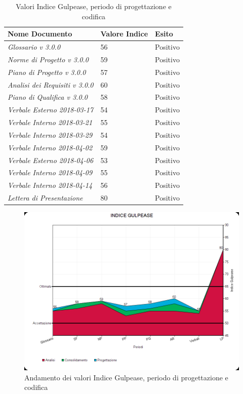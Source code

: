 \documentclass[openany,12pt,a4paper]{report}
\begin{document}
\begin{itemize}
	\begin{table}[h]
		\begin{center}
			\setlength\LTleft{6mm}
			\begin{longtable}{|p{60mm}|p{30mm}|p{25mm}|}
				\hline  
				\textbf{Nome Documento} & \textbf{Valore Indice} & \textbf{Esito} \\ \hline    
				\textit{Glossario v 3.0.0} & 56 & Positivo\\ \hline    
				\textit{Norme di Progetto v 3.0.0} & 59 & Positivo\\ \hline    
				\textit{Piano di Progetto v 3.0.0} & 57 & Positivo\\ \hline    
				\textit{Analisi dei Requisiti v 3.0.0} & 60 & Positivo\\ \hline    
				\textit{Piano di Qualifica v 3.0.0} & 58 & Positivo\\ \hline    
				\textit{Verbale Esterno 2018-03-17} & 54 & Positivo\\ \hline
				\textit{Verbale Interno 2018-03-21} & 55 & Positivo\\ \hline
				\textit{Verbale Interno 2018-03-29} & 54 & Positivo\\ \hline
				\textit{Verbale Interno 2018-04-02} & 59 & Positivo\\ \hline
				\textit{Verbale Esterno 2018-04-06} & 53 & Positivo\\ \hline    
				\textit{Verbale Interno 2018-04-09} & 55 & Positivo\\ \hline
				\textit{Verbale Interno 2018-04-14} & 56 & Positivo\\ \hline
				\textit{Lettera di Presentazione} & 80 & Positivo\\ \hline
			\end{longtable}
		\end{center}
		\caption{Valori Indice Gulpease, periodo di progettazione e codifica} 
	\end{table} 
	
	\begin{figure}[H]
		\includegraphics[scale=0.5]{Gulpease/gulpease-progettazione}
		\centering
		\caption{Andamento dei valori Indice Gulpease, periodo di progettazione e codifica}
	\end{figure}
	

\end{itemize}
\end{document}

